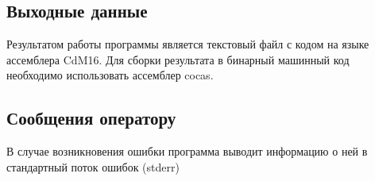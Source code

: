 \documentclass[a4paper,14pt]{extarticle}
\begin{document}
\subsection{Выходные данные}
Результатом работы программы является текстовый файл с кодом на языке ассемблера CdM16. Для сборки результата в бинарный машинный код необходимо использовать ассемблер cocas.
\subsection{Сообщения оператору}
В случае возникновения ошибки программа выводит информацию о ней в стандартный поток ошибок (stderr)
\end{document}
